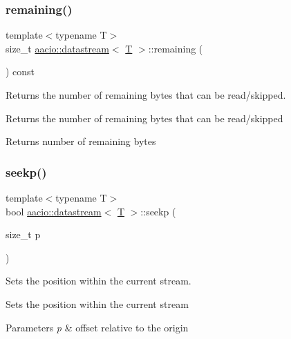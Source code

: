 \subsubsection{\texorpdfstring{remaining()}{remaining()}}
{\footnotesize\ttfamily template$<$typename T$>$ \\
size\+\_\+t \mbox{\hyperlink{classaacio_1_1datastream}{aacio\+::datastream}}$<$ \mbox{\hyperlink{struct_t}{T}} $>$\+::remaining (\begin{DoxyParamCaption}{ }\end{DoxyParamCaption}) const\hspace{0.3cm}{\ttfamily [inline]}}



Returns the number of remaining bytes that can be read/skipped. 

Returns the number of remaining bytes that can be read/skipped \begin{DoxyReturn}{Returns}
number of remaining bytes 
\end{DoxyReturn}
\mbox{\label{classaacio_1_1datastream_af1b27cb7b6b4fbf6d13b2512d1f7f55b}} 
\subsubsection{\texorpdfstring{seekp()}{seekp()}}
{\footnotesize\ttfamily template$<$typename T$>$ \\
bool \mbox{\hyperlink{classaacio_1_1datastream}{aacio\+::datastream}}$<$ \mbox{\hyperlink{struct_t}{T}} $>$\+::seekp (\begin{DoxyParamCaption}\item[{size\+\_\+t}]{p }\end{DoxyParamCaption})\hspace{0.3cm}{\ttfamily [inline]}}



Sets the position within the current stream. 

Sets the position within the current stream 
\begin{DoxyParams}{Parameters}
{\em p} & offset relative to the origin \\
\hline
\end{DoxyParams}
\mbox{\label{classaacio_1_1datastream_a61b35e6cf749800d83fb8623ae59572d}} 
